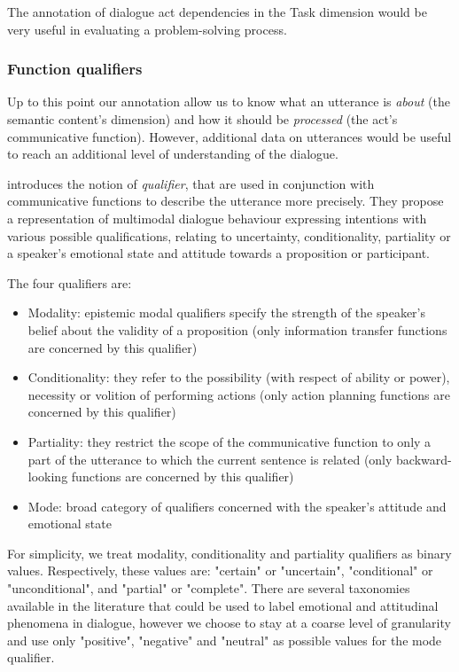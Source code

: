 The annotation of dialogue act dependencies in the Task dimension would be very useful in evaluating a problem-solving process.

\subsubsection{Function qualifiers}

Up to this point our annotation allow us to know what an utterance is \textit{about} (the semantic content's dimension) and how it should be \textit{processed} (the act's communicative function). However, additional data on utterances would be useful to reach an additional level of understanding of the dialogue. 

\cite{petukhova2010introducing} introduces the notion of \textit{qualifier}, that are used in conjunction with communicative functions to describe the utterance more precisely. They propose a representation of multimodal dialogue behaviour expressing intentions with various possible qualifications, relating to uncertainty, conditionality, partiality or a speaker’s emotional state and attitude towards a proposition or participant.

The four qualifiers are:

\begin{itemize}
	\item Modality: epistemic modal qualifiers specify the strength of the speaker's belief about the validity of a proposition (only information transfer functions are concerned by this qualifier)
	\item Conditionality: they refer to the possibility (with respect of ability or power), necessity or volition of performing actions (only action planning functions are concerned by this qualifier)
	\item Partiality: they restrict the scope of the communicative function to only a part of the utterance to which the current sentence is related (only backward-looking functions are concerned by this qualifier)
	\item Mode: broad category of qualifiers concerned with the speaker's attitude and emotional state
\end{itemize}

For simplicity, we treat modality, conditionality and partiality qualifiers as binary values. Respectively, these values are: "certain" or "uncertain", "conditional" or "unconditional", and "partial" or "complete". There are several taxonomies available in the literature that could be used to label emotional and attitudinal phenomena in dialogue, however we choose to stay at a coarse level of granularity and use only "positive", "negative" and "neutral" as possible values for the mode qualifier.

